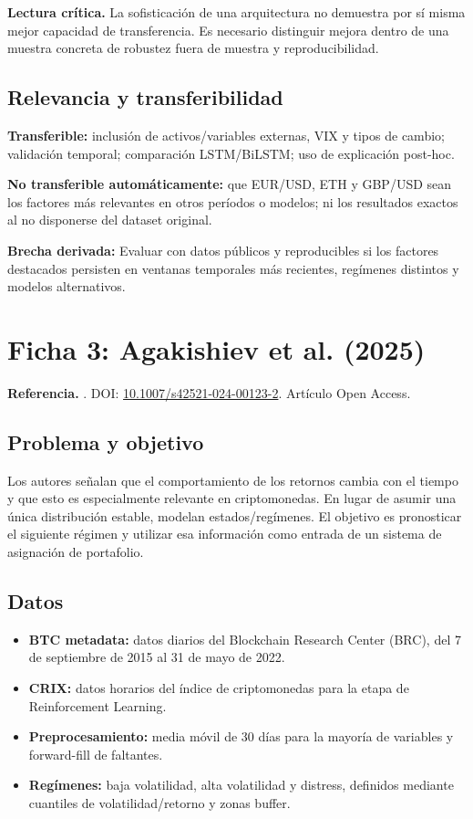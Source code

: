 \documentclass[11pt,letterpaper]{article}
\newcommand{\gapbox}[1]{\par\medskip\noindent\colorbox{gris}{\parbox{0.96\linewidth}{\textbf{Brecha derivada:} #1}}\medskip}
\newcommand{\critica}[1]{\par\smallskip\noindent\textbf{Lectura crítica.} #1}
\begin{document}
\critica{La sofisticación de una arquitectura no demuestra por sí misma mejor capacidad de transferencia. Es necesario distinguir mejora dentro de una muestra concreta de robustez fuera de muestra y reproducibilidad.}

\subsection{Relevancia y transferibilidad}
\textbf{Transferible:} inclusión de activos/variables externas, VIX y tipos de cambio; validación temporal; comparación LSTM/BiLSTM; uso de explicación post-hoc.

\textbf{No transferible automáticamente:} que EUR/USD, ETH y GBP/USD sean los factores más relevantes en otros períodos o modelos; ni los resultados exactos al no disponerse del dataset original.

\gapbox{Evaluar con datos públicos y reproducibles si los factores destacados persisten en ventanas temporales más recientes, regímenes distintos y modelos alternativos.}

\section{Ficha 3: Agakishiev et al. (2025)}

\textbf{Referencia.} \textcite{agakishiev2025}. DOI: \href{https://doi.org/10.1007/s42521-024-00123-2}{10.1007/s42521-024-00123-2}. Artículo Open Access.

\subsection{Problema y objetivo}
Los autores señalan que el comportamiento de los retornos cambia con el tiempo y que esto es especialmente relevante en criptomonedas. En lugar de asumir una única distribución estable, modelan estados/regímenes. El objetivo es pronosticar el siguiente régimen y utilizar esa información como entrada de un sistema de asignación de portafolio.

\subsection{Datos}
\begin{itemize}
  \item \textbf{BTC metadata:} datos diarios del Blockchain Research Center (BRC), del 7 de septiembre de 2015 al 31 de mayo de 2022.
  \item \textbf{CRIX:} datos horarios del índice de criptomonedas para la etapa de Reinforcement Learning.
  \item \textbf{Preprocesamiento:} media móvil de 30 días para la mayoría de variables y forward-fill de faltantes.
  \item \textbf{Regímenes:} baja volatilidad, alta volatilidad y distress, definidos mediante cuantiles de volatilidad/retorno y zonas buffer.
\end{itemize}
\end{document}

